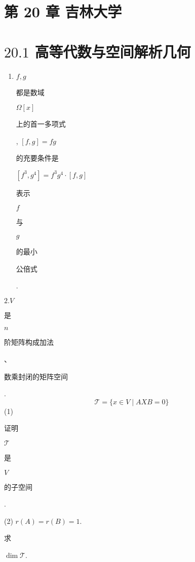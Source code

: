 \documentclass[10pt]{article}
\begin{document}
\section{第 20 章 吉林大学}
\section{$20.1$ 高等代数与空间解析几何}
\begin{enumerate}
  \item $f, g$ \begin{CJK}{UTF8}{mj}都是数域\end{CJK} $\Omega[x]$ \begin{CJK}{UTF8}{mj}上的首一多项式\end{CJK}, $[f, g]=f g$ \begin{CJK}{UTF8}{mj}的充要条件是\end{CJK} $\left[f^{3}, g^{4}\right]=f^{3} g^{4} \cdot[f, g]$ \begin{CJK}{UTF8}{mj}表示\end{CJK} $f$ \begin{CJK}{UTF8}{mj}与\end{CJK} $g$ \begin{CJK}{UTF8}{mj}的最小\end{CJK} \begin{CJK}{UTF8}{mj}公倍式\end{CJK}.
\end{enumerate}
$2 . V$ \begin{CJK}{UTF8}{mj}是\end{CJK} $n$ \begin{CJK}{UTF8}{mj}阶矩阵构成加法\end{CJK}、\begin{CJK}{UTF8}{mj}数乘封闭的矩阵空间\end{CJK}.
$$
\mathscr{T}=\{x \in V \mid A X B=0\}
$$
(1) \begin{CJK}{UTF8}{mj}证明\end{CJK} $\mathscr{T}$ \begin{CJK}{UTF8}{mj}是\end{CJK} $V$ \begin{CJK}{UTF8}{mj}的子空间\end{CJK}.

(2) $r(A)=r(B)=1$. \begin{CJK}{UTF8}{mj}求\end{CJK} $\operatorname{dim} \mathscr{T}$.
\end{document}
